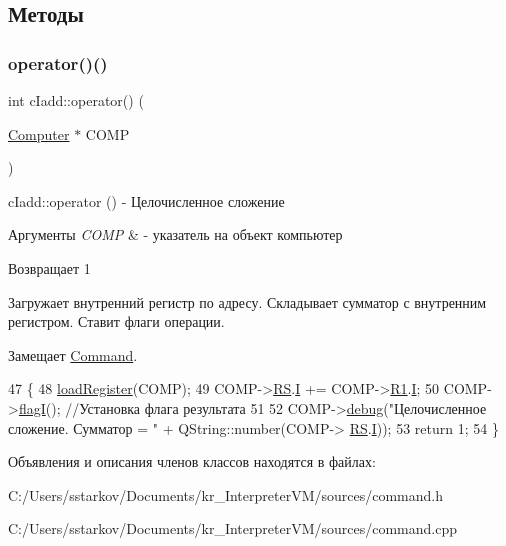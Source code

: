 \subsection{Методы}
\hypertarget{classc_iadd_a05d46274b9bf1fd3f3d292210dcbd99c}{}\label{classc_iadd_a05d46274b9bf1fd3f3d292210dcbd99c} 
\subsubsection{\texorpdfstring{operator()()}{operator()()}}
{\footnotesize\ttfamily int c\+Iadd\+::operator() (\begin{DoxyParamCaption}\item[{\hyperlink{class_computer}{Computer} $\ast$}]{C\+O\+MP }\end{DoxyParamCaption})\hspace{0.3cm}{\ttfamily [virtual]}}



c\+Iadd\+::operator () -\/ Целочисленное сложение 


\begin{DoxyParams}{Аргументы}
{\em C\+O\+MP} & -\/ указатель на объект компьютер \\
\hline
\end{DoxyParams}
\begin{DoxyReturn}{Возвращает}
1
\end{DoxyReturn}
Загружает внутренний регистр по адресу. Складывает сумматор с внутренним регистром. Ставит флаги операции. 

Замещает \hyperlink{class_command_a79939b66f3de892e91d7710844294716}{Command}.


\begin{DoxyCode}
47 \{
48     \hyperlink{class_command_aac6f368e7c9dbb357b3f00627d5dabfc}{loadRegister}(COMP);
49     COMP->\hyperlink{class_computer_a874503110664b3cf821118d2ce9c2b96}{RS}.\hyperlink{union_computer_1_1data_a6e51de6e0351adc4e50b336a092bc4bb}{I} += COMP->\hyperlink{class_computer_a0fbf84599b7db9d634a92afed443ee73}{R1}.\hyperlink{union_computer_1_1data_a6e51de6e0351adc4e50b336a092bc4bb}{I};
50     COMP->\hyperlink{class_computer_aae4a76a8a03a6c9fb1c12968d629be3e}{flagI}(); \textcolor{comment}{//Установка флага результата}
51 
52     COMP->\hyperlink{class_computer_a10ca6c6b200630119201de16d7368e0f}{debug}(\textcolor{stringliteral}{"Целочисленное сложение. Сумматор = "} + QString::number(COMP->
      \hyperlink{class_computer_a874503110664b3cf821118d2ce9c2b96}{RS}.\hyperlink{union_computer_1_1data_a6e51de6e0351adc4e50b336a092bc4bb}{I}));
53     \textcolor{keywordflow}{return} 1;
54 \}
\end{DoxyCode}


Объявления и описания членов классов находятся в файлах\+:\begin{DoxyCompactItemize}
\item 
C\+:/\+Users/sstarkov/\+Documents/kr\+\_\+\+Interpreter\+V\+M/sources/command.\+h\item 
C\+:/\+Users/sstarkov/\+Documents/kr\+\_\+\+Interpreter\+V\+M/sources/command.\+cpp\end{DoxyCompactItemize}
